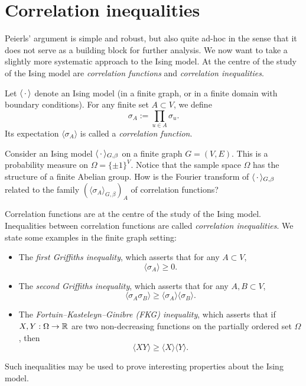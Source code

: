 \section{Correlation inequalities}
\label{sec:correlation}

Peierls' argument is simple and robust, but also quite ad-hoc in the sense
that it does not serve as a building block for further analysis.
We now want to take a slightly more systematic approach to the Ising model.
At the centre of the study of the Ising model are \emph{correlation functions}
and \emph{correlation inequalities}.

Let $\langle\,\cdot\,\rangle$ denote an Ising model (in a finite graph,
or in a finite domain with boundary conditions).
For any finite set $A\subset V$, we define
\[
    \sigma_{A}:=\prod_{u\in A}\sigma_u.
\]
Its expectation $\langle\sigma_A\rangle$ is called a \emph{correlation function}.

\begin{exercise}
    Consider an Ising model $\langle\,\cdot\,\rangle_{G,\beta}$
    on a finite graph $G=(V,E)$.
    This is a probability measure on $\Omega=\{\pm1\}^V$.
    Notice that the sample space $\Omega$ has the structure of a finite Abelian group.
    How is the Fourier transform of $\langle\,\cdot\,\rangle_{G,\beta}$ related
    to the family $(\langle\sigma_A\rangle_{G,\beta})_A$ of correlation functions?
\end{exercise}

Correlation functions are at the centre of the study of the Ising model.
Inequalities between correlation functions are called \emph{correlation inequalities}.
We state some examples in the finite graph setting:
\begin{itemize}
    \item The \emph{first Griffiths inequality}, which asserts that for any $A\subset V$,
        \[
            \langle\sigma_A\rangle\geq 0.
        \]
    \item The \emph{second Griffiths inequality}, which asserts that for any $A,B\subset V$,
    \[
        \langle\sigma_A\sigma_B\rangle
        \geq
        \langle\sigma_A\rangle\langle\sigma_B\rangle.
    \]
    \item The \emph{Fortuin--Kasteleyn--Ginibre (FKG) inequality}, which asserts that
    if $X,Y:\Omega\to\mathbb R$ are two non-decreasing functions on the partially ordered set $\Omega$,
    then
    \[
        \langle XY\rangle
        \geq
        \langle X\rangle\langle Y\rangle.
    \]    
\end{itemize}
Such inequalities may be used to prove interesting properties about the Ising model.

\begin{remark}
\end{remark}

\begin{exercise}

\end{exercise}


